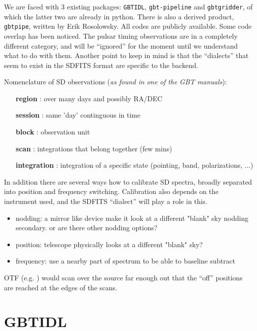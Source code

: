 \documentclass[12pt,a4paper]{article}
\begin{document}
We are faced with 3 existing packages: {\tt GBTIDL}, {\tt gbt-pipeline} and
{\tt gbtgridder}, of which the latter two are already in python. There is also
a derived product, {\tt gbtpipe}, written by Erik Rosolowsky. All codes are
publicly available. Some code overlap has been noticed. The pulsar timing observations are
in a completely different category, and will be ``ignored'' for the
moment until we understand what to do with them. Another point to keep in mind is that
the ``dialects'' that seem to exist in the SDFITS format are specific to the backend.

Nomenclature of SD observations ({\it as found in one of the GBT manuals}):

\begin{itemize}
  \item[{\bf region}]  : over many days and possibly RA/DEC
  \item[{\bf session}] : same 'day' continguous in time
  \item[{\bf block}]   : observation unit
  \item[{\bf scan}]    : integrations that belong together (few mins)
  \item[{\bf integration}] : integration of a specific state (pointing, band, polarizations, ...)
\end{itemize}   


In addition there are several ways how to calibrate SD spectra, broadly separated
into position and frequency switching. Calibration also depends on the instrument used,
and the SDFITS ``dialect'' will play a role in this.

\begin{itemize}
\item
nodding:    a mirror like device make it look at a different "blank" sky
nodding secondary. or are there other nodding options?
\item
position:   telescope physically looks at a different "blank" sky?
\item
frequency:  use a nearby part of spectrum to be able to baseline subtract
\end{itemize}

OTF (e.g. \cite{2007AA...474..679M})
would scan over the source far enough out that the ``off'' positions are reached at
the edges of the scans.

\section{GBTIDL}
\end{document}
